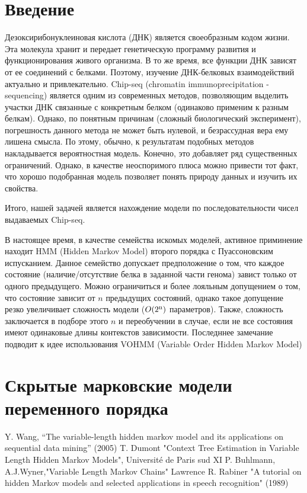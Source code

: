 \documentclass[10pt,a4paper]{article}
\begin{document}
\section{Введение}

Дезоксирибонуклеиновая кислота (ДНК) является своеобразным кодом жизни. Эта молекула хранит и передает генетическую программу развития и функционирования живого организма. 
В то же время, все функции ДНК зависят от ее соединений с белками. 
Поэтому, изучение ДНК-белковых взаимодействий актуально и привлекательно.
Chip-seq (chromatin immunoprecipitation - sequencing)\cite{Chip-seq} является одним из современных методов, позволяющим выделить участки ДНК связанные с конкретным белком (одинаково применим к разным белкам). 
Однако, по понятным причинам (сложный биологический эксперимент), погрешность данного метода не может быть нулевой, и безрассудная вера ему лишена смысла. По этому, обычно, к результатам подобных методов накладывается вероятностная модель. Конечно, это добавляет ряд существенных ограничений. Однако, в качестве неоспоримого плюса можно привести тот факт, что хорошо подобранная модель позволяет понять природу данных и изучить их свойства.

Итого, нашей задачей является нахождение модели по последовательности чисел выдаваемых Chip-seq. 

В настоящее время, в качестве семейства искомых моделей, активное приминение находит HMM (Hidden Markov Model)\cite{HMM} второго порядка с Пуассоновским испусканием. 
Данное семейство допускает предположение о том, что каждое состояние (наличие/отсутствие белка в заданной части генома) завист только от одного предыдущего.
Можно ограничиться и более лояльным допущением о том, что состояние зависит от $n$ предыдущих состояний, однако такое допущение резко увеличивает сложность модели ($O(2\textsuperscript{n})$ параметров). Также, сложность заключается в подборе этого $n$ и переобучении в случае, если не все состояния имеют одинаковые длины контекстов зависимости.
Последннее замечание подводит к идее использования VOHMM (Variable Order Hidden Markov Model)\cite{Wang}


\section{Скрытые марковские модели переменного порядка}


 
 
 
\begin{thebibliography}{9}
 Y. Wang, “The variable-length hidden markov model and its applications on sequential data mining” (2005)
 T. Dumont "Context Tree Estimation in Variable Length
Hidden Markov Models", Université de Paris sud XI
 P. Buhlmann, A.J.Wyner,"Variable Length Markov Chains"
 \cite{http://bioinformaticsinstitute.ru/projects/563}
 Lawrence R. Rabiner "A tutorial on hidden Markov models and selected applications in speech recognition" (1989)
\end{thebibliography}
\end{document}
